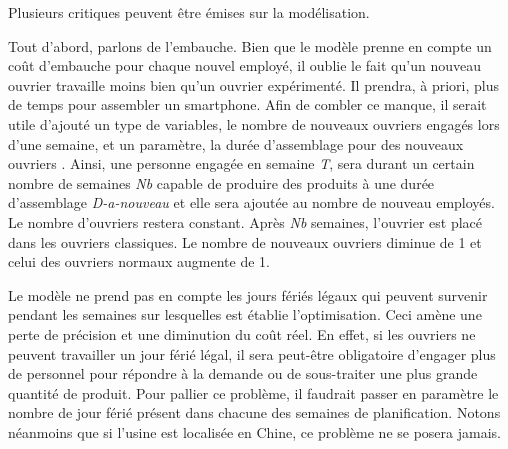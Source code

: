 Plusieurs critiques peuvent être émises sur la modélisation.

Tout d'abord, parlons de  l'embauche. Bien que le modèle prenne en compte un coût d'embauche pour chaque nouvel employé, il oublie le fait qu'un nouveau ouvrier travaille moins bien qu'un ouvrier expérimenté. Il prendra, à priori, plus de temps pour assembler un smartphone. Afin de combler ce manque, il serait utile d'ajouté un type de variables, le nombre de nouveaux ouvriers engagés lors d'une semaine, et un paramètre, la durée d'assemblage pour des nouveaux ouvriers . Ainsi, une personne engagée en semaine \textit{T}, sera durant un certain nombre de semaines \textit{Nb} capable de produire des produits à une durée d'assemblage \textit{D-a-nouveau} et elle sera ajoutée au nombre de nouveau employés. Le nombre d'ouvriers restera constant. Après \textit{Nb} semaines, l'ouvrier est placé dans les ouvriers classiques. Le nombre de nouveaux ouvriers diminue de 1 et celui des ouvriers normaux augmente de 1.

Le modèle ne prend pas en compte les jours fériés légaux qui peuvent survenir pendant les semaines sur lesquelles est établie l'optimisation. Ceci  amène une perte de précision et une diminution du coût réel. En effet, si les ouvriers ne peuvent travailler un jour férié légal, il sera peut-être obligatoire d'engager plus de personnel pour répondre à la demande ou de sous-traiter une plus grande quantité de produit. Pour pallier ce problème, il faudrait passer en paramètre le nombre de jour férié présent dans chacune des semaines de planification. Notons néanmoins que si l'usine est localisée en Chine, ce problème ne se posera jamais.